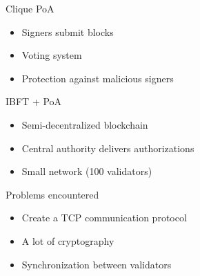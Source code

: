 \documentclass[12pt]{beamer}
\begin{document}
  \begin{frame}{Clique PoA}
    \begin{itemize}
      \item Signers submit blocks
      \item Voting system
      \item Protection against malicious signers
    \end{itemize}
  \end{frame}

  \begin{frame}{IBFT + PoA}
    \begin{itemize}
      \item Semi-decentralized blockchain
      \item Central authority delivers authorizations
      \item Small network (100 validators)
    \end{itemize}
  \end{frame}

  \begin{frame}{Problems encountered}
    \begin{itemize}
      \item Create a TCP communication protocol
      \item A lot of cryptography
      \item Synchronization between validators
    \end{itemize}

  \end{frame}
\end{document}
